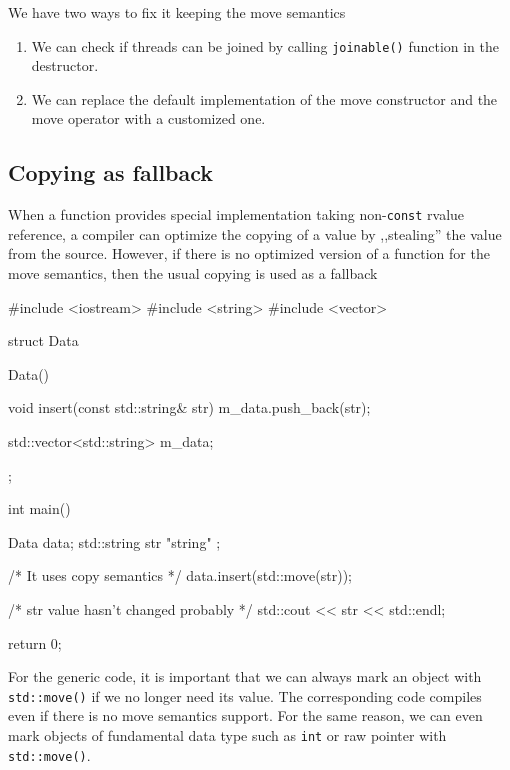 \documentclass[../main]{subfiles}
\begin{document}
    We have two ways to fix it keeping the move semantics
\begin{enumerate}
    \item We can check if threads can be joined by calling \texttt{joinable()} function in the destructor.
    \item We can replace the default implementation of the move constructor and the move operator with a customized one.
\end{enumerate}

\subsection{Copying as fallback}
    When a function provides special implementation taking non-\texttt{const} rvalue reference, a compiler can optimize the copying of a value by ,,stealing'' the value from the source.
However, if there is no optimized version of a function for the move semantics, then the usual copying is used as a fallback
\begin{Code}
    #include <iostream>
    #include <string>
    #include <vector>
    
    struct Data
    {
        Data() {}
    
        void insert(const std::string& str)
        {
            m_data.push_back(str);
        }
    
        std::vector<std::string> m_data;
    };
    
    int main()
    {
        Data data;
        std::string str { "string" };
        
        /* It uses copy semantics */
        data.insert(std::move(str));

        /* str value hasn't changed probably */
        std::cout << str << std::endl;
    
        return 0;
    }
\end{Code}

    For the generic code, it is important that we can always mark an object with \texttt{std::move()} if we no longer need its value.
The corresponding code compiles even if there is no move semantics support. For the same reason, we can even mark objects of fundamental data type such as
\texttt{int} or raw pointer with \texttt{std::move()}.\newline
\end{document}
